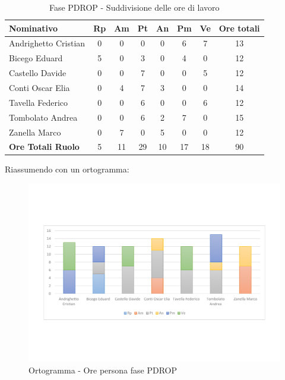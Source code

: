\documentclass[../PianoProgetto.tex]{subfiles}
\begin{document}
	\begin{table}[h]
		\begin{tabularx}{\textwidth}{l  * {6}{C}  c}
			\toprule
			\textbf{Nominativo} & \textbf{Rp} & \textbf{Am} & \textbf{Pt} 
						& \textbf{An} & \textbf{Pm} & \textbf{Ve} & \textbf{Ore totali} \\
			\midrule
			Andrighetto Cristian & 0 & 0 & 0 & 0 & 6 & 7 & 13 \\
			Bicego Eduard & 5 & 0 &	3 &	0 &	4 &	0 &	12 \\
			Castello Davide & 0 & 0 & 7 & 0 & 0 & 5 & 12 \\
			Conti Oscar Elia &0 & 4 & 7 & 3 & 0 & 0 & 14 \\
			Tavella Federico &	0 & 0 & 6 & 0 & 0 & 6 & 12 \\
			Tombolato Andrea & 0 & 0 & 6 & 2 & 7 & 0 & 15 \\
			Zanella Marco & 0 & 7 & 0 & 5 & 0 & 0 & 12 \\
			\midrule			
			\textbf{Ore Totali Ruolo} & 5 & 11 & 29 & 10 & 17 & 18 & 90 \\
			\bottomrule
		\end{tabularx}
		\caption{Fase PDROP - Suddivisione delle ore di lavoro}
		\label{tab:fasePDROP_ore}
	\end{table}
	
\newpage
\vfill	
	Riassumendo con un ortogramma:
	
	\begin{figure}[!h]
		\centering
		\includegraphics[width=\textwidth , trim=2cm 5cm 2cm 5cm]{grafici/PDROP/PDROP-ore-persona}
			\caption{Ortogramma - Ore persona fase PDROP}
		\label{fig:BarChart-fasePDROP_ore}
	\end{figure}
\vfill	
	
\end{document}
